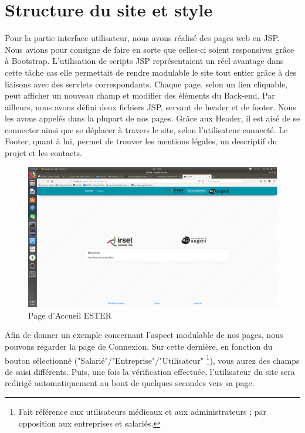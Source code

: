 \section{Structure du site et style}


Pour la partie interface utilisateur, nous avons réalisé des pages web en JSP. Nous avions pour consigne de faire en sorte que celles-ci soient responsives grâce à Bootstrap. L'utilisation de scripts JSP représentaient un réel avantage dans cette tâche cas elle permettait de rendre modulable le site tout entier grâce à des liaisons avec des servlets correspondants. Chaque page, selon un lien cliquable, peut afficher un nouveau champ et modifier des éléments du Back-end. Par ailleurs, nous avons défini deux fichiers JSP, servant de header et de footer. Nous les avons appelés dans la plupart de nos pages. Grâce aux Header, il est aisé de se connecter ainsi que se déplacer à travers le site, selon l'utilisateur connecté. Le Footer, quant à lui, permet de trouver les mentions légales, un descriptif du projet et les contacts.

\begin{figure}[H]
    \begin{center}
	\includegraphics[scale=0.2,trim=4cm 0cm 4cm 5.3cm, clip=true]{img/ESTER}
    \end{center}
    \caption{Page d'Accueil ESTER}
\end{figure}

Afin de donner un exemple concernant l'aspect modulable de nos pages, nous pouvons regarder la page de Connexion. Sur cette dernière, en fonction du bouton sélectionné ("Salarié"/"Entreprise"/"Utilisateur" \footnote{Fait référence aux utilisateurs médicaux et aux administrateurs ; par opposition aux entreprises et salariés.}), vous aurez des champs de saisi différents. Puis, une fois la vérification effectuée, l'utilisateur du site sera redirigé automatiquement au bout de quelques secondes vers sa page.


